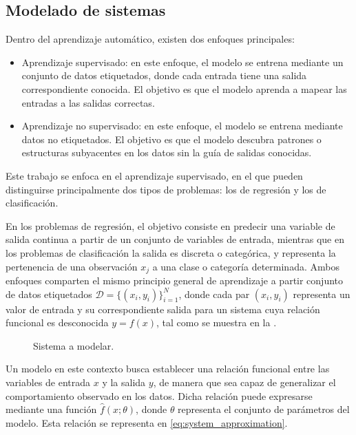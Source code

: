 \subsection{Modelado de sistemas}
\label{sec:modelado_de_sistemas}
Dentro del aprendizaje automático, existen dos enfoques principales:

\begin{itemize}
    \item Aprendizaje supervisado: en este enfoque, el modelo se entrena mediante un conjunto de datos etiquetados, donde cada entrada tiene una salida correspondiente conocida. El objetivo es que el modelo aprenda a mapear las entradas a las salidas correctas.
    \item Aprendizaje no supervisado: en este enfoque, el modelo se entrena mediante datos no etiquetados. El objetivo es que el modelo descubra patrones o estructuras subyacentes en los datos sin la guía de salidas conocidas.
\end{itemize}

Este trabajo se enfoca en el aprendizaje supervisado, en el que pueden distinguirse principalmente dos tipos de problemas: los de regresión y los de clasificación.

En los problemas de regresión, el objetivo consiste en predecir una variable de salida continua a partir de un conjunto de variables de entrada, mientras que en los problemas de clasificación la salida es discreta o categórica, y representa la pertenencia de una observación $x_j$ a una clase o categoría determinada. Ambos enfoques comparten el mismo principio general de aprendizaje a partir conjunto de datos etiquetados $\mathcal{D} = \{(x_i,y_i)\}_{i=1}^N$, donde cada par $(x_i,y_i)$ representa un valor de entrada y su correspondiente salida para un sistema cuya relación funcional es desconocida $y = f(x)$, tal como se muestra en la .

\begin{figure}[H]
    \centering
    \caption{Sistema a modelar.}
    \label{fig:system}
\end{figure}

Un modelo en este contexto busca establecer una relación funcional entre las variables de entrada $x$ y la salida $y$, de manera que sea capaz de generalizar el comportamiento observado en los datos. Dicha relación puede expresarse mediante una función $\hat{f}(x;\theta)$, donde $\theta$ representa el conjunto de parámetros del modelo. Esta relación se representa en \eqref{eq:system_approximation}.

